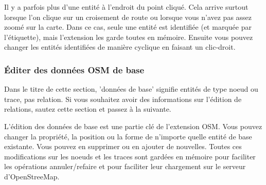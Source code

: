 Il y a parfois plus d'une entité à l'endroit du point cliqué. Cela arrive surtout lorsque l'on clique sur un croisement de route ou lorsque vous n'avez pas assez zoomé sur la carte. Dans ce cas, seule une entité est identifiée (et marquée par l'étiquette), mais l'extension les garde toutes en mémoire. Ensuite vous pouvez changer les entités identifiées de manière cyclique en faisant un clic-droit.

\subsubsection{Éditer des données OSM de base}

Dans le titre de cette section, 'données de base' signifie entités de type noeud ou trace, pas relation. Si vous souhaitez avoir des informations sur l'édition de relations, sautez cette section et passez à la suivante.
 
L'édition des données de base est une partie clé de l'extension OSM. Vous pouvez changer la propriété, la position ou la forme de n'importe quelle entité de base existante. Vous pouvez en supprimer ou en ajouter de nouvelles. Toutes ces modifications sur les noeuds et les traces sont gardées en mémoire pour faciliter les opérations annuler/refaire et pour faciliter leur chargement sur le serveur d'OpenStreeMap.


